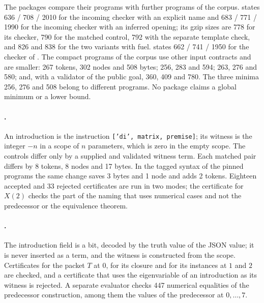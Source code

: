 The packages compare their programs with further programs of the corpus.
 states 636 / 708 / 2010 for the incoming checker with
an explicit name and 683 / 771 / 1990 for the incoming checker with an
inferred opening; its gzip sizes are 778 for its checker, 790 for the
matched control, 792 with the separate template check, and 826 and 838 for
the two variants with fuel.   states
662 / 741 / 1950 for the checker of .  The compact
programs of the corpus use other input contracts and are smaller: 267
tokens, 302 nodes and 508 bytes; 256, 283 and 594; 263, 276 and 580; and,
with a validator of the public goal, 360, 409 and 780.  The three minima
256, 276 and 508 belong to different programs.  No package claims a global
minimum or a lower bound.

\paragraph{.}
An introduction is the instruction \texttt{['di', matrix, premise]}; its
witness is the integer $-n$ in a scope of $n$ parameters, which is zero in
the empty scope.  The controls differ only by a supplied and validated
witness term.  Each matched pair differs by 8 tokens, 8 nodes and 17 bytes.
In the tagged syntax of the pinned programs the same change saves 3 bytes
and 1 node and adds 2 tokens.  Eighteen accepted and 33 rejected
certificates are run in two modes; the certificate for $X(2)$ checks the
part of the naming that uses numerical cases and not the predecessor or the
equivalence theorem.

\paragraph{.}
The introduction field is a bit, decoded by the truth value of the JSON
value; it is never inserted as a term, and the witness is constructed from
the scope.  Certificates for the packet $T$ at $0$, for its closure and for
its instances at $1$ and $2$ are checked, and a certificate that uses the
eigenvariable of an introduction as its witness is rejected.  A separate
evaluator checks 447 numerical equalities of the predecessor construction,
among them the values of the predecessor at $0,\dots,7$.

